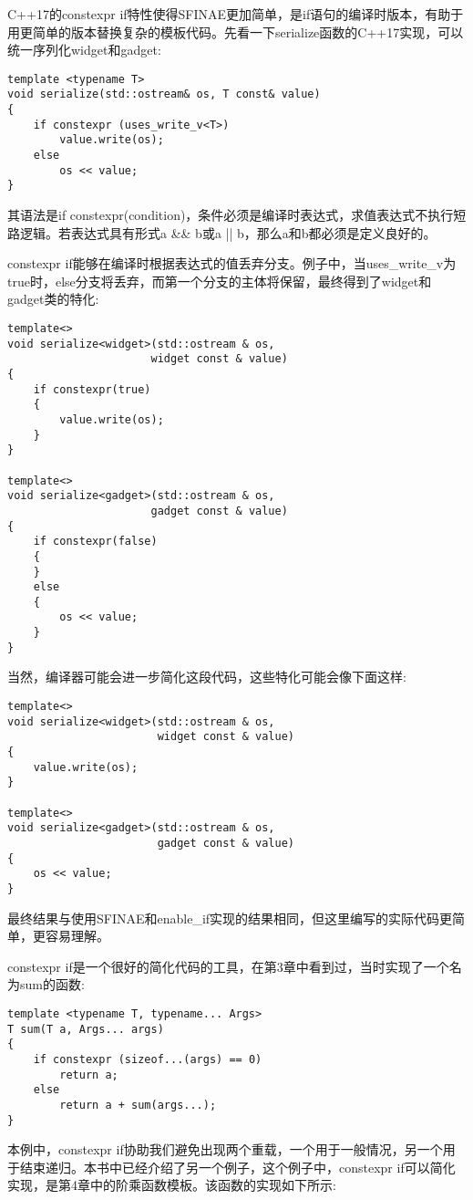 C++17的constexpr if特性使得SFINAE更加简单，是if语句的编译时版本，有助于用更简单的版本替换复杂的模板代码。先看一下serialize函数的C++17实现，可以统一序列化widget和gadget:

\begin{lstlisting}[style=styleCXX]
template <typename T>
void serialize(std::ostream& os, T const& value)
{
	if constexpr (uses_write_v<T>)
		value.write(os);
	else
		os << value;
}
\end{lstlisting}

其语法是if constexpr(condition)，条件必须是编译时表达式，求值表达式不执行短路逻辑。若表达式具有形式a \&\& b或a || b，那么a和b都必须是定义良好的。

constexpr if能够在编译时根据表达式的值丢弃分支。例子中，当uses\_write\_v为true时，else分支将丢弃，而第一个分支的主体将保留，最终得到了widget和gadget类的特化:

\begin{lstlisting}[style=styleCXX]
template<>
void serialize<widget>(std::ostream & os,
                      widget const & value)
{
	if constexpr(true)
	{
		value.write(os);
	}
}

template<>
void serialize<gadget>(std::ostream & os,
                      gadget const & value)
{
	if constexpr(false)
	{
	}
	else
	{
		os << value;
	}
}
\end{lstlisting}

当然，编译器可能会进一步简化这段代码，这些特化可能会像下面这样:

\begin{lstlisting}[style=styleCXX]
template<>
void serialize<widget>(std::ostream & os,
                       widget const & value)
{
	value.write(os);
}

template<>
void serialize<gadget>(std::ostream & os,
					   gadget const & value)
{
	os << value;
}
\end{lstlisting}

最终结果与使用SFINAE和enable\_if实现的结果相同，但这里编写的实际代码更简单，更容易理解。

constexpr if是一个很好的简化代码的工具，在第3章中看到过，当时实现了一个名为sum的函数:

\begin{lstlisting}[style=styleCXX]
template <typename T, typename... Args>
T sum(T a, Args... args)
{
	if constexpr (sizeof...(args) == 0)
		return a;
	else
		return a + sum(args...);
}
\end{lstlisting}

本例中，constexpr if协助我们避免出现两个重载，一个用于一般情况，另一个用于结束递归。本书中已经介绍了另一个例子，这个例子中，constexpr if可以简化实现，是第4章中的阶乘函数模板。该函数的实现如下所示:

